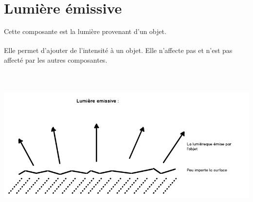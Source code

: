 \section{Lumière émissive}
Cette composante est la lumière provenant d'un objet.
\\\\
Elle permet d'ajouter de l'intensité à un objet.
Elle n'affecte pas et n'est pas affecté par les autres composantes.
\\\\
\begin{center}
\includegraphics[width=17cm,height=7cm]{pipeline/images/lumiere_emissive.png}
\end{center}